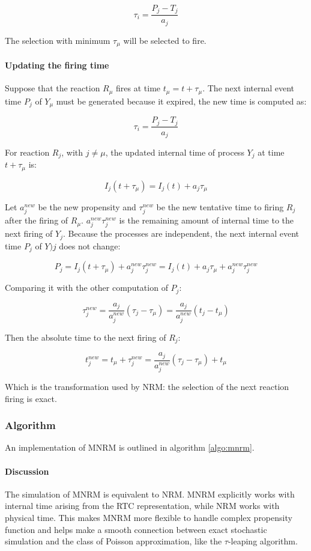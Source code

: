       $$\tau_i = \frac{P_j-T_j}{a_j}$$

      The selection with minimum $\tau_\mu$ will be selected to fire.

      \paragraph{Updating the firing time}
      Suppose that the reaction $R_\mu$ fires at time $t_\mu = t+\tau_\mu$.
      The next internal event time $P_j$ of $Y_\mu$ must be generated because it expired, the new time is computed as:

      $$\tau_i = \frac{P_j-T_j}{a_j}$$

      For reaction $R_j$, with $j\neq\mu$, the updated internal time of process $Y_j$ at time $t+\tau_\mu$ is:

      $$I_j(t+\tau_\mu) = I_j(t) + a_j\tau_\mu$$

      Let $a_j^{new}$ be the new propensity and $\tau_j^{new}$ be the new tentative time to firing $R_j$ after the firing of $R_\mu$.
      $a_j^{new}\tau_j^{new}$ is the remaining amount of internal time to the next firing of $Y_j$.
      Because the processes are independent, the next internal event time $P_j$ of $Y)j$ does not change:

      $$P_j = I_j(t+\tau_\mu) + a_j^{new}\tau_j^{new} = I_j(t) + a_j\tau_\mu + a_j^{new}\tau_j^{new}$$

      Comparing it with the other computation of $P_j$:

      $$\tau_j^{new} = \frac{a_j}{a_j^{new}}(\tau_j-\tau_\mu) = \frac{a_j}{a_j^{new}}(t_j-t_\mu)$$

      Then the absolute time to the next firing of $R_j$:

      $$t_j^{new} = t_\mu + \tau_j^{new} = \frac{a_j}{a_j^{new}}(\tau_j-\tau_\mu)+t_\mu$$

      Which is the transformation used by NRM: the selection of the next reaction firing is exact.

    \subsubsection{Algorithm}
    An implementation of MNRM is outlined in algorithm \ref{algo:mnrm}.

    

      \paragraph{Discussion}
      The simulation of MNRM is equivalent to NRM.
      MNRM explicitly works with internal time arising from the RTC representation, while NRM works with physical time.
      This makes MNRM more flexible to handle complex propensity function and helps make a smooth connection between exact stochastic simulation and the class of Poisson approximation, like the $\tau$-leaping algorithm.

